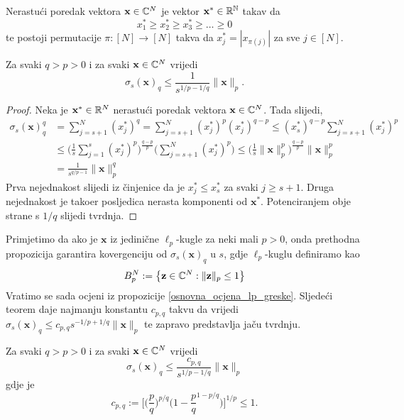 \documentclass[a4paper,twoside,12pt]{memoir} %
\newcommand{\vect}[1]{\mathbf{#1}}
\renewcommand{\vec}{\vect}
\begin{document}
\begin{defn}
    Nerastu\'ci poredak vektora $\vec{x} \in \C^{N}$ je vektor $\vec{x}^* \in \R^{\N}$ takav da
    $$x^*_1 \geq x^*_2 \geq x^*_3 \geq \dots \geq 0$$
    te postoji permutacije $\pi : [N]\rightarrow[N]$ takva da $x^*_j=|x_{\pi(j)}|$ za sve $j\in [N]$.
\end{defn}
\begin{prop}\label{osnovna_ocjena_lp_greske}
    Za svaki $q > p > 0$ i za svaki $\vec{x}\in \C^{N}$ vrijedi
    $$\sigma_s(\vec{x})_q \leq \frac{1}{s^{1/p - 1/q}}\|\vec{x}\|_p.$$
\end{prop}
\begin{proof}
    Neka je $\vec{x}^* \in \R^N$ nerastu\'ci poredak vektora $\vec{x}\in\C^N$. Tada slijedi,
    \begin{equation*}
    \begin{split} 
        \sigma_s(\vec{x})_q^q &= \sum_{j=s+1}^{N}(x_j^*)^q=\sum_{j=s+1}^{N}(x_j^*)^p(x_j^*)^{q-p} \leq (x_s^*)^{q-p} \sum_{j=s+1}^{N}(x_j^*)^p \\ & \leq \bigg(\frac{1}{s}\sum_{j=1}^{s}(x_j^*)^p\bigg)^{\frac{q-p}{p}}\bigg( \sum_{j=s+1}^N(x_j^*)^p\bigg) \leq \bigg( \frac{1}{s} \|\vec{x}\|_p^p \bigg)^{\frac{q-p}{p}}\|\vec{x}\|_p^p \\ & = \frac{1}{s^{q/p-1}}\|\vec{x}\|_p^q
    \end{split}
    \end{equation*}
    Prva nejednakost slijedi iz \v{c}injenice da je $x_j^* \leq x_s^*$ za svaki $j \geq s+1$. Druga nejednakost je tako\dj er posljedica nerasta komponenti od $\vec{x}^*$. Potenciranjem obje strane s $1/q$ slijedi tvrdnja.
\end{proof}
Primjetimo da ako je $\vec{x}$ iz jedini\v{c}ne $\ell_p$-kugle za neki mali $p>0$, onda prethodna propozicija garantira kovergenciju od $\sigma_s(\vec{x})_q$ u $s$, gdje $\ell_p$-kuglu definiramo kao
$$B_p^N := \big\{ \vec{z} \in \C^N : \|\vec{z}\|_p \leq 1\big\}$$
Vratimo se sada ocjeni iz propozicije \ref{osnovna_ocjena_lp_greske}. Sljede\'ci teorem daje najmanju konstantu $c_{p,q}$ takvu da vrijedi $\sigma_s(\vec{x})_q\leq c_{p,q}s^{-1/p+1/q}\|\vec{x}\|_p$ te zapravo predstavlja ja\v{c}u tvrdnju.
\begin{thm}\label{tm:2:5}
    Za svaki $q > p > 0$ i za svaki $\vec{x}\in\C^N$ vrijedi
    \begin{equation*}
    \sigma_s(\vec{x})_q \leq \frac{c_{p,q}}{s^{1/p - 1/q}}\|\vec{x}\|_p
    \end{equation*}
    gdje je
    $$
    c_{p,q} := \bigg[ \bigg(\frac{p}{q}\bigg)^{p/q}\bigg( 1-\frac{p}{q}^{1-p/q}\bigg) \bigg]^{1/p}\leq1.
    $$
\end{thm}
\end{document}
